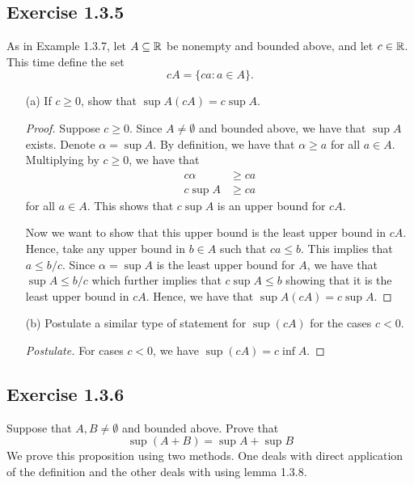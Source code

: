 \subsection{Exercise 1.3.5}
As in Example 1.3.7, let \( A \subseteq \mathbb{R} \) be nonempty and bounded above, and let \( c \in \mathbb{R} \). This time define the set 
\[ cA = \{ca: a \in A \}. \]
\begin{enumerate}
    \item[(a)] If \( c \geq 0 \), show that \( \sup A (cA ) = c\sup A \).
    \begin{proof}
        Suppose \( c \geq 0 \). Since \( A \neq \emptyset \) and bounded above, we have that \( \sup A \) exists. Denote \( \alpha = \sup A \). By definition, we have that \( \alpha \geq a \) for all \( a \in A \). Multiplying by \( c \geq 0 \), we have that 
        \begin{align*}
            c\alpha &\geq ca \\ 
            c\sup A &\geq ca
        \end{align*}
        for all \( a \in A \). This shows that \( c \sup A \) is an upper bound for \( cA \).
        
        Now we want to show that this upper bound is the least upper bound in \( cA \). Hence, take any upper bound in \( b \in A \) such that \( ca \leq b \). This implies that \( a \leq b/c \). Since \( \alpha = \sup A \) is the least upper bound for \( A \), we have that \( \sup A \leq b/c \) which further implies that \( c \sup A \leq b \) showing that it is the least upper bound in \( cA \). Hence, we have that 
        \( \sup A (cA ) = c\sup A \).
    \end{proof}
    \item[(b)] Postulate a similar type of statement for \( \sup (cA) \) for the cases \( c < 0 \).
    \begin{proof}[Postulate]
        For cases \( c < 0 \), we have \( \sup (cA ) = c\inf A \).
    \end{proof} 
\end{enumerate}




\subsection{Exercise 1.3.6}
Suppose that \( A,B \neq \emptyset \) and bounded above. Prove that 
\[ 
\sup(A+B) = \sup A + \sup B     
\]
We prove this proposition using two methods. One deals with direct application of the definition and the other deals with using lemma 1.3.8. 



